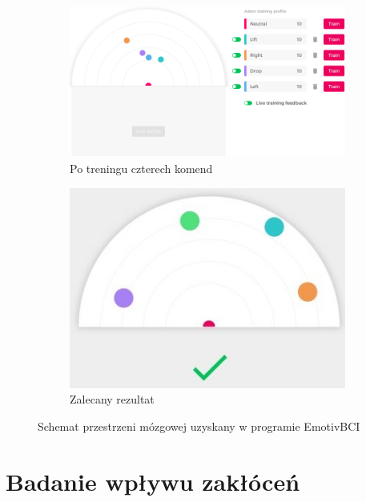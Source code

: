 \documentclass[skorowidz,skroty]{dyplomWEZUT}
\begin{document}
\begin{figure}[htb]
    \medskip
    \begin{subfigure}{0.49\textwidth}
    \includegraphics[width=\linewidth]{graphic/4commands}
    \caption{Po treningu czterech komend\label{fig:brainmap_four}}
    \end{subfigure}\hspace*{\fill}
    \begin{subfigure}{0.49\textwidth}
    \includegraphics[width=\linewidth]{graphic/propercommands}
    \caption{Zalecany rezultat\label{fig:brainmap_recommended}}
    \end{subfigure}
    
    \caption{Schemat przestrzeni mózgowej uzyskany w programie EmotivBCI\label{fig:brainmap}}
\end{figure}


\section{Badanie wpływu zakłóceń}
\end{document}
